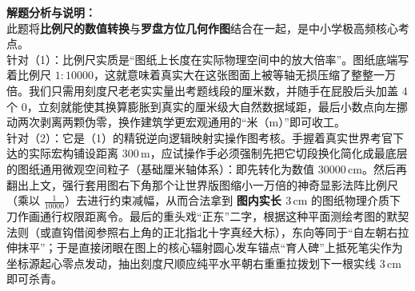 {\small\color{gray}
\textbf{解题分析与说明：}\\
此题将\textbf{比例尺的数值转换}与\textbf{罗盘方位几何作图}结合在一起，是中小学极高频核心考点。\\
针对（1）：比例尺实质是“图纸上长度在实际物理空间中的放大倍率”。图纸底端写着比例尺 $1:10000$，这就意味着真实大在这张图面上被等轴无损压缩了整整一万倍。我们只需用刻度尺老老实实量出考题线段的厘米数，并随手在屁股后头加盖 $4$ 个 $0$，立刻就能使其换算膨胀到真实的厘米级大自然数据域距，最后小数点向左挪动两次剥离两颗伪零，换作建筑学更宏观通用的“米（$\text{m}$）”即可收工。\\
针对（2）：它是（1）的精锐逆向逻辑映射实操作图考核。手握着真实世界考官下达的实际宏构铺设距离 $300\,\text{m}$，应试操作手必须强制先把它切段换化简化成最底层的图纸通用微观空间粒子（基础厘米轴体系）：即先转化为数值 $30000\,\text{cm}$。然后再翻出上文，强行套用图右下角那个让世界版图缩小一万倍的神奇显影法阵比例尺（乘以 $\frac{1}{10000}$）去进行约束减幅，从而合法拿到 \textbf{图内实长 $3\,\text{cm}$} 的图纸物理介质下刀作画通行权限距离令。最后的重头戏“正东”二字，根据这种平面测绘考图的默契法则（或直钩借阅参照右上角的正北指北十字真经大标），东向等同于“自左朝右拉伸抹平”；于是直接闭眼在图上的核心辐射圆心发车锚点“育人碑”上抵死笔尖作为坐标源起心零点发动，抽出刻度尺顺应纯平水平朝右重重拉拨划下一根实线 $3\,\text{cm}$ 即可杀青。
}

\vspace{0.6cm}

